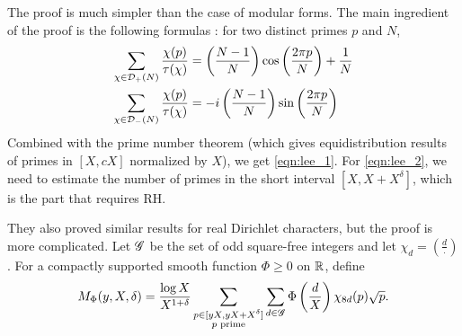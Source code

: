 The proof is much simpler than the case of modular forms.
The main ingredient of the proof is the following formulas \cite[Lemma 2.6]{lee2025murmurations}: for two distinct primes $p$ and $N$,
\begin{align}
    \sum_{\chi \in \mathcal{D}_{+}(N)} \frac{\chi(p)}{\tau(\chi)} &= \left(\frac{N-1}{N}\right) \cos \left(\frac{2 \pi p}{N}\right) + \frac{1}{N} \\
    \sum_{\chi \in \mathcal{D}_{-}(N)} \frac{\chi(p)}{\tau(\chi)} &= -i\left(\frac{N-1}{N}\right) \sin \left(\frac{2 \pi p}{N}\right)
\end{align}
Combined with the prime number theorem (which gives equidistribution results of primes in $[X, cX]$ normalized by $X$), we get \eqref{eqn:lee_1}.
For \eqref{eqn:lee_2}, we need to estimate the number of primes in the short interval $[X, X + X^\delta]$, which is the part that requires RH.

They also proved similar results for real Dirichlet characters, but the proof is more complicated.
Let $\mathscr{G}$ be the set of odd square-free integers and let $\chi_{d} = \left(\frac{d}{\cdot}\right)$.
For a compactly supported smooth function $\Phi \ge 0$ on $\mathbb{R}$, define
\begin{equation}
    M_{\Phi}(y, X, \delta) = \frac{\log X}{X^{1 + \delta}} \sum_{\substack{p \in [yX, yX + X^\delta] \\ p \text{ prime}}} \sum_{d \in \mathscr{G}} \Phi\left(\frac{d}{X}\right) \chi_{8d}(p) \sqrt{p}.
\end{equation}

